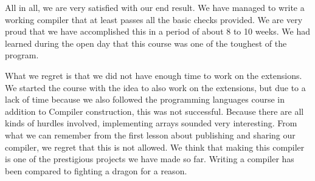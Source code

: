 \documentclass{uva-inf-article}
\begin{document}
All in all, we are very satisfied with our end result. 
We have managed to write a working compiler that at least passes all the basic checks provided. 
We are very proud that we have accomplished this in a period of about 8 to 10 weeks. 
We had learned during the open day that this course was one of the toughest of the program.

What we regret is that we did not have enough time to work on the extensions. 
We started the course with the idea to also work on the extensions, but due to a lack of time 
because we also followed the programming languages course in addition to Compiler construction, this was not successful.
Because there are all kinds of hurdles involved, implementing arrays sounded very interesting.
From what we can remember from the first lesson about publishing and sharing our compiler, 
we regret that this is not allowed. We think that making this compiler is one of the prestigious projects we have made so far. 
Writing a compiler has been compared to fighting a dragon for a reason.





\end{document}
